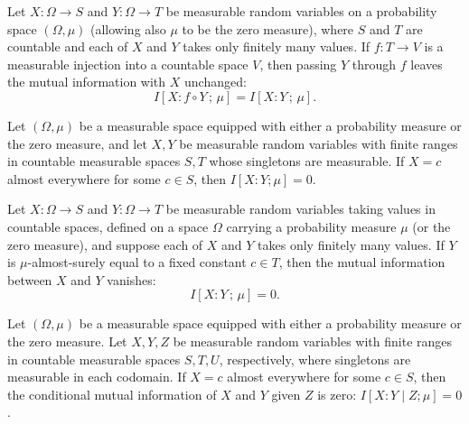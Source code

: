 \begin{theorem}
\label{ProbabilityTheory.mutualInfo_comp_right_of_injective}
\leanok
{}
Let $X\colon\Omega\to S$ and $Y\colon\Omega\to T$ be measurable random variables on a
probability space $(\Omega,\mu)$ (allowing also $\mu$ to be the zero measure), where $S$
and $T$ are countable and each of $X$ and $Y$ takes only finitely many values. If
$f\colon T\to V$ is a measurable injection into a countable space $V$, then passing $Y$
through $f$ leaves the mutual information with $X$ unchanged:
\[
I[X : f\circ Y\, ;\, \mu] = I[X : Y\, ;\, \mu].
\]
\end{theorem}

\begin{theorem}
\label{ProbabilityTheory.mutualInfo_eq_zero_of_ae_eq_const_left}
\leanok
{}
Let $(\Omega,\mu)$ be a measurable space equipped with either a probability measure or
the zero measure, and let $X,Y$ be measurable random variables with finite ranges in
countable measurable spaces $S,T$ whose singletons are measurable. If $X=c$ almost
everywhere for some $c\in S$, then $I[X:Y;\mu]=0$.
\end{theorem}

\begin{theorem}
\label{ProbabilityTheory.mutualInfo_eq_zero_of_ae_eq_const_right}
\leanok
{}
Let $X \colon \Omega \to S$ and $Y \colon \Omega \to T$ be measurable random variables
taking values in countable spaces, defined on a space $\Omega$ carrying a probability
measure $\mu$ (or the zero measure), and suppose each of $X$ and $Y$ takes only finitely
many values. If $Y$ is $\mu$-almost-surely equal to a fixed constant $c \in T$, then the
mutual information between $X$ and $Y$ vanishes: \[ I[X : Y \,;\, \mu] = 0. \]
\end{theorem}

\begin{theorem}
\label{ProbabilityTheory.condMutualInfo_eq_zero_of_ae_eq_const_left}
\leanok
{}
Let $(\Omega,\mu)$ be a measurable space equipped with either a probability measure or
the zero measure. Let $X,Y,Z$ be measurable random variables with finite ranges in
countable measurable spaces $S,T,U$, respectively, where singletons are measurable in
each codomain. If $X=c$ almost everywhere for some $c\in S$, then the conditional mutual
information of $X$ and $Y$ given $Z$ is zero: $I[X:Y\mid Z;\mu]=0$.
\end{theorem}

